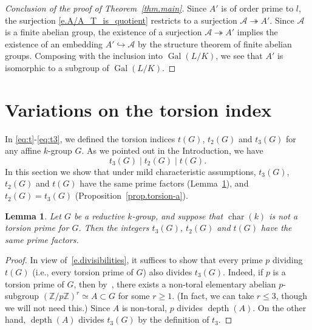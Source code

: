 \documentclass[12pt]{amsart}
\numberwithin{equation}{section}
\newtheorem{lemma}[theorem]{Lemma}
\theoremstyle{remark}
\newcommand{\Gal}{\operatorname{Gal}}
\newcommand{\Char}{\operatorname{char}}
\newcommand{\depth}{\operatorname{depth}}
\newcommand{\bZ}{\mathbb{Z}}
\begin{document}
\begin{proof}[Conclusion of the proof of Theorem~\ref{thm.main}]

Since $A'$ is of order prime to $l$, the surjection \eqref{e.A/A_T_is_quotient} restricts to a surjection $\mathcal{A} \twoheadrightarrow A'$. Since $\mathcal{A}$ is a finite abelian group, the existence of a surjection $\mathcal{A} \twoheadrightarrow A'$ implies the existence of an embedding $A'\hookrightarrow \mathcal{A}$ by the structure theorem of finite abelian groups. Composing with the inclusion into $\Gal(L/K)$, we see that $A'$ is isomorphic to a subgroup of $\Gal(L/K)$.
\end{proof}



\section{Variations on the torsion index}
\label{sect.t_2=t_3}

In \eqref{eq:t}-\eqref{eq:t3}, we defined the torsion indices $t(G)$, $t_2(G)$ and $t_3(G)$ for any affine $k$-group $G$. As we pointed out in the Introduction, we have 
\begin{equation} \label{e.divisibilities}
t_3(G) \mid t_2(G) \mid t(G).
\end{equation}
In this section we show that under mild characteristic assumptions, $t_3(G)$, $t_2(G)$ and $t(G)$ have the same prime factors (Lemma~\ref{lem.same-prime-factors}), and $t_2(G) = t_3(G)$ (Proposition~\ref{prop.torsion-a}).

\begin{lemma} \label{lem.same-prime-factors}
Let $G$ be a reductive $k$-group, and suppose that $\Char(k)$ is not a torsion prime for $G$. Then the integers $t_3(G)$, $t_2(G)$ and $t(G)$ have the same prime factors.
\end{lemma}

\begin{proof} 
In view of~\eqref{e.divisibilities}, it suffices to show that every prime $p$ dividing $t(G)$ (i.e., every torsion prime of $G$) also divides $t_3(G)$. Indeed, if $p$ is a torsion prime of $G$,
then by~\cite[Theorem 2.28]{steinberg-torsion}, there exists a non-toral elementary abelian $p$-subgroup $(\bZ/p\bZ)^r \simeq A \subset G$ for some $r \geqslant 1$. (In fact, we can take $r \leqslant 3$, though we will not need this.) Since $A$ is non-toral, $p$ divides $\depth(A)$. On the other hand, $\depth(A)$ divides $t_3(G)$ by the definition of $t_3$.
\end{proof}
\end{document}
